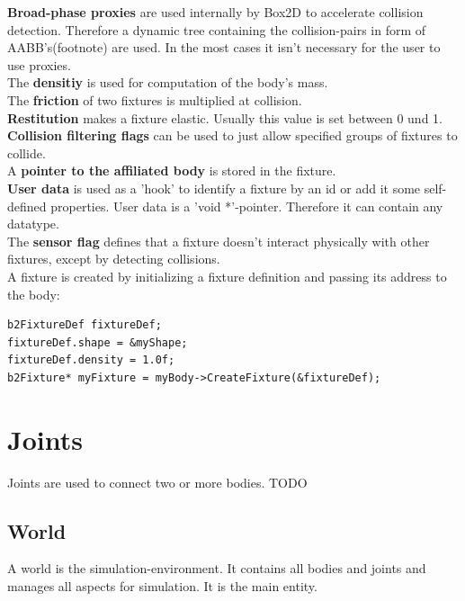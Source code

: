\documentclass[10pt,a4paper,DIV=11]{scrreprt}
\begin{document}
\textbf{Broad-phase proxies} are used internally by Box2D to accelerate collision detection. Therefore a dynamic tree containing the collision-pairs in form of AABB's(footnote) are used. In the most cases it isn't necessary for the user to use proxies. \\

The \textbf{densitiy} is used for computation of the body's mass.\\

The \textbf{friction} of two fixtures is multiplied at collision. \\

\textbf{Restitution} makes a fixture elastic. Usually this value is set between 0 und 1. \\

\textbf{Collision filtering flags} can be used to just allow specified groups of fixtures to collide. \\

A \textbf{pointer to the affiliated body} is stored in the fixture.\\

\textbf{User data} is used as a 'hook' to identify a fixture by an id or add it some self-defined properties. User data is a 'void *'-pointer. Therefore it can contain any datatype. \\

The \textbf{sensor flag} defines that a fixture doesn't interact physically with other fixtures, except by detecting collisions. \\



A fixture is created by initializing a fixture definition and passing its address to the body:

\begin{lstlisting}[caption={Creation of a fixture (source Box2D manual)},label=lst:fixture-create]
b2FixtureDef fixtureDef;
fixtureDef.shape = &myShape;
fixtureDef.density = 1.0f;
b2Fixture* myFixture = myBody->CreateFixture(&fixtureDef);
\end{lstlisting}


\section{Joints}
Joints are used to connect two or more bodies.
TODO

\subsection{World}
A world is the simulation-environment. It contains all bodies and joints and manages all aspects for simulation. It is the main entity.
\end{document}
